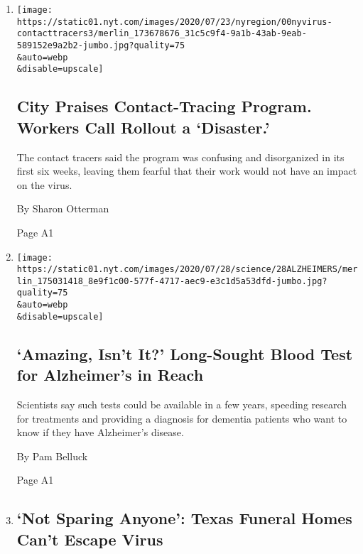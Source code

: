 \begin{enumerate}
\def\labelenumi{\arabic{enumi}.}
\item
  \href{/2020/07/29/nyregion/new-york-contact-tracing.html}{}

  \texttt{[image: https://static01.nyt.com/images/2020/07/23/nyregion/00nyvirus-contacttracers3/merlin\_173678676\_31c5c9f4-9a1b-43ab-9eab-589152e9a2b2-jumbo.jpg?quality=75\\\&auto=webp\\\&disable=upscale]}

  \hypertarget{city-praises-contact-tracing-program-workers-call-rollout-a-disaster}{%
  \subsection{City Praises Contact-Tracing Program. Workers Call Rollout
  a
  `Disaster.'}\label{city-praises-contact-tracing-program-workers-call-rollout-a-disaster}}

  The contact tracers said the program was confusing and disorganized in
  its first six weeks, leaving them fearful that their work would not
  have an impact on the virus.

  By Sharon Otterman

  Page A1
\item
  \href{/2020/07/28/health/alzheimers-blood-test.html}{}

  \texttt{[image: https://static01.nyt.com/images/2020/07/28/science/28ALZHEIMERS/merlin\_175031418\_8e9f1c00-577f-4717-aec9-e3c1d5a53dfd-jumbo.jpg?quality=75\\\&auto=webp\\\&disable=upscale]}

  \hypertarget{amazing-isnt-it-long-sought-blood-test-for-alzheimers-in-reach}{%
  \subsection{`Amazing, Isn't It?' Long-Sought Blood Test for
  Alzheimer's in
  Reach}\label{amazing-isnt-it-long-sought-blood-test-for-alzheimers-in-reach}}

  Scientists say such tests could be available in a few years, speeding
  research for treatments and providing a diagnosis for dementia
  patients who want to know if they have Alzheimer's disease.

  By Pam Belluck

  Page A1
\item
  \href{/2020/07/28/us/coronavirus-texas-funeral-homes.html}{}

  \hypertarget{not-sparing-anyone-texas-funeral-homes-cant-escape-virus}{%
  \subsection{`Not Sparing Anyone': Texas Funeral Homes Can't Escape
  Virus}\label{not-sparing-anyone-texas-funeral-homes-cant-escape-virus}}


\end{enumerate}
